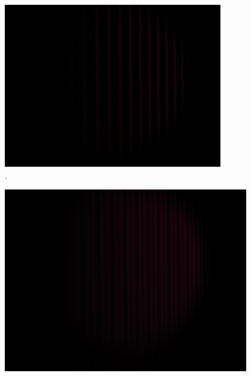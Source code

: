 \newpage
{}
\label{sec:Anhang}

\begin{figure}[h!]
  \centering
  \includegraphics[width=0.85\textwidth]{data/temp/rot_ohneB_0.JPG}
  \caption{\cite{insert Beschriftung}.}
  \label{fig:roteOhneB0}
\end{figure}
\begin{figure}[h!]
  \centering
  \includegraphics[width=0.95\textwidth]{data/temp/rot_mitB_0.JPG}
  \caption{\cite{insert Beschriftung 2}}
  \label{fig:rotMitB0}
\end{figure}
